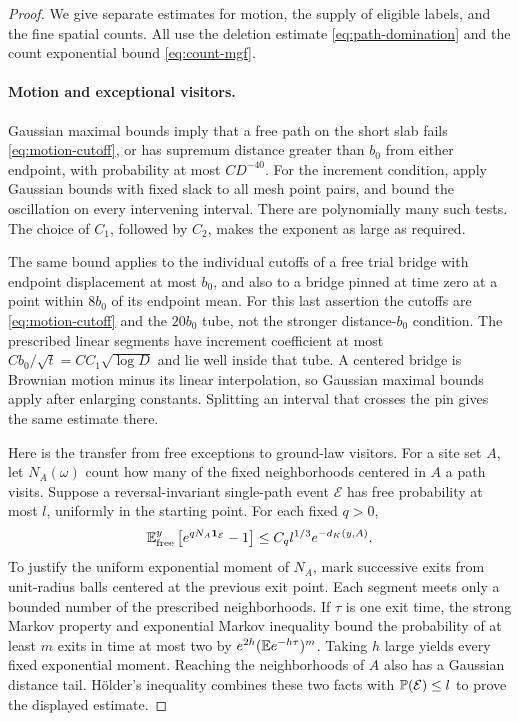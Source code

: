 \begin{proof}
We give separate estimates for motion, the supply of eligible labels,
and the fine spatial counts.  All use the deletion estimate
\eqref{eq:path-domination} and the count exponential bound
\eqref{eq:count-mgf}.

\paragraph{Motion and exceptional visitors.}
Gaussian maximal bounds imply that a free path on the short slab fails
\eqref{eq:motion-cutoff}, or has supremum distance greater than $b_0$
from either endpoint, with probability at most $CD^{-40}$.  For the
increment condition, apply Gaussian bounds with fixed slack to all mesh
point pairs, and bound the oscillation on every intervening interval.
There are polynomially many such tests.  The choice of $C_1$, followed
by $C_2$, makes the exponent as large as required.

The same bound applies to the individual cutoffs of a free trial bridge
with endpoint displacement at most $b_0$, and also to a bridge pinned
at time zero at a point within $8b_0$ of its endpoint mean.  For this
last assertion the cutoffs are \eqref{eq:motion-cutoff} and the
$20b_0$ tube, not the stronger distance-$b_0$ condition.  The prescribed
linear segments have increment coefficient at most
$Cb_0/\sqrt t=CC_1\sqrt{\log D}$ and lie well inside that tube.
A centered bridge is Brownian motion minus its linear interpolation,
so Gaussian maximal bounds apply after enlarging constants.  Splitting
an interval that crosses the pin gives the same estimate there.

Here is the transfer from free exceptions to ground-law visitors.  For
a site set $A$, let $N_A(\omega)$ count how many of the fixed
neighborhoods centered in $A$ a path visits.  Suppose a
reversal-invariant single-path event $\mathcal E$ has free probability
at most $l$, uniformly in the starting point.  For each fixed $q>0$,
\[
 \mathbb E^y_{\rm free}\left[e^{qN_A\mathbf 1_{\mathcal E}}-1\right]
          \le C_q l^{1/3}e^{-d_K(y,A)}.
\]
To justify the uniform exponential moment of $N_A$, mark successive
exits from unit-radius balls centered at the previous exit point.
Each segment meets only a bounded number of the prescribed
neighborhoods.  If $\tau$ is one exit time, the strong Markov property
and exponential Markov inequality bound the probability of at least
$m$ exits in time at most two by
$e^{2h}(\mathbb E e^{-h\tau})^m$.  Taking $h$ large yields every fixed
exponential moment.  Reaching the neighborhoods of $A$ also has a
Gaussian distance tail.  H\"older's inequality combines these two
facts with $\mathbb P(\mathcal E)\le l$ to prove the displayed estimate.


\end{proof}
